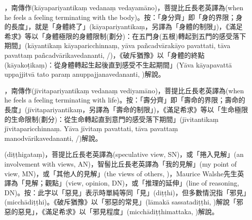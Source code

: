 \startitemgroup[noteitems]
\item{}，南傳作(kāyapariyantikaṃ vedanaṃ vedayamāno)，菩提比丘長老英譯為(when he feels a feeling terminating with the body)。按：「身分齊」即「身的界限；身的長度」，就是「身體終了」(kāyapariyantikaṃ，另譯為「身體的制限」)，《滿足希求》等以「身體極限的身體限制(劃分)：在五門身(五根)轉起到五門的感受落下期間」(kāyantikaṃ kāyaparicchinnaṃ, yāva pañcadvārakāyo pavattati, tāva pavattaṃ pañcadvārikavedananti, /)，《破斥猶豫》以「身體的終點(kāyakoṭikaṃ)：從身體轉起生起後直到感受不生起期間」(Yāva kāyapavattā uppajjitvā tato paraṃ anuppajjanavedananti, )解說。
\stopitemgroup

\startitemgroup[noteitems]
\item{}，南傳作(jīvitapariyantikaṃ vedanaṃ vediyamāno)，菩提比丘長老英譯為(when he feels a feeling terminating with life)。按：「壽分齊」即「壽命的界限；壽命的長度」(jīvitapariyantikaṃ，另譯為「壽命的制限」)，《滿足希求》等以「生命極限的生命限制(劃分)：從生命轉起直到意門的感受落下期間」(jīvitantikaṃ jīvitaparicchinnaṃ. Yāva jīvitaṃ pavattati, tāva pavattaṃ manodvārikavedananti, /)解說。
\stopitemgroup

\startitemgroup[noteitems]
\item{}(diṭṭhigataṃ)，菩提比丘長老英譯為(speculative view, SN)，或「捲入見解」(an involvement with views, AN)，智髻比丘長老英譯為「我的見解」(my point of view, MN)，或「其他人的見解」(the views of others, )，Maurice Walshe先生英譯為「見解；觀點」(view, opinion, DN)，或「推理的延伸」(line of reasoning, DN)。按：此字以「{惡}見」表示時單純等同「見」(diṭṭhi)，但多數情況指「邪見」(micchādiṭṭhi)。《破斥猶豫》以「邪惡的常見」(lāmakā sassatadiṭṭhi, )解說「邪惡的惡見」，《滿足希求》以「邪見程度」(micchādiṭṭhimattaka, )解說。
\stopitemgroup

